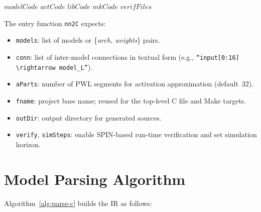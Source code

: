 \begin{algorithm}[htbp]
    \caption{Generate C Artefacts}\label{alg:generate-c}
    \begin{algorithmic}[1]
        \State \Return $modelCode$
    \EndFunction
        \State \Return $actCode$
    \EndFunction
        \State \Return $libCode$
    \EndFunction
        \State \Return $mkCode$
    \EndFunction
        \State \Return $verifFiles$
    \EndFunction
    \end{algorithmic}
\end{algorithm}

The entry function \texttt{nn2C} expects:

\begin{itemize}
  \item \texttt{models}: list of models or \{\emph{arch, weights}\} pairs.
  \item \texttt{conn}: list of inter-model connections in textual form (e.g., \texttt{``input[0:16]\,$\rightarrow$\,model\_L''}).
  \item \texttt{aParts}: number of PWL segments for activation approximation (default~32).
  \item \texttt{fname}: project base name; reused for the top-level C file and Make targets.
  \item \texttt{outDir}: output directory for generated sources.
  \item \texttt{verify}, \texttt{simSteps}: enable SPIN-based run-time verification and set simulation horizon.
\end{itemize}

\section{Model Parsing Algorithm}

Algorithm~\ref{alg:parse-c} builds the IR as follows:

